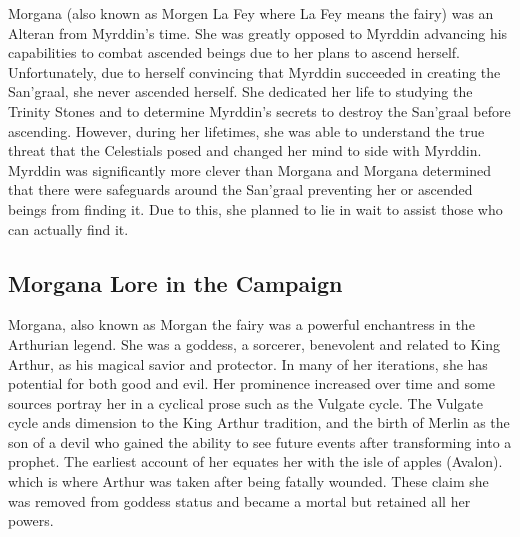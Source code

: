 Morgana (also known as Morgen La Fey where La Fey means the fairy) was an Alteran from Myrddin's time. She was greatly opposed to Myrddin advancing his capabilities to combat ascended beings due to her plans to ascend herself. Unfortunately, due to herself convincing that Myrddin succeeded in creating the San'graal, she never ascended herself. She dedicated her life to studying the Trinity Stones and to determine Myrddin's secrets to destroy the San'graal before ascending. However, during her lifetimes, she was able to understand the true threat that the Celestials posed and changed her mind to side with Myrddin. Myrddin was significantly more clever than Morgana and Morgana determined that there were safeguards around the San'graal preventing her or ascended beings from finding it. Due to this, she planned to lie in wait to assist those who can actually find it. 

\subsection{Morgana Lore in the Campaign}

Morgana, also known as Morgan the fairy was a powerful enchantress in the Arthurian legend. She was a goddess, a sorcerer, benevolent and related to King Arthur, as his magical savior and protector. In many of her iterations, she has potential for both good and evil. Her prominence increased over time and some sources portray her in a cyclical prose such as the Vulgate cycle. The Vulgate cycle ands dimension to the King Arthur tradition, and the birth of Merlin as the son of a devil who gained the ability to see future events after transforming into a prophet. The earliest account of her equates her with the isle of apples (Avalon). which is where Arthur was taken after being fatally wounded. These claim she was removed from goddess status and became a mortal but retained all her powers.

 

